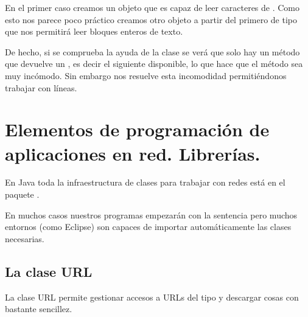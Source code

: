 \documentclass[letterpaper,10pt,spanish]{sphinxmanual}
\begin{document}
%
\begin{sphinxVerbatim}[commandchars=\\\{\}]
  
         
  
         
\end{sphinxVerbatim}

En el primer caso creamos un objeto  que es capaz de leer caracteres de . Como esto nos parece poco práctico creamos otro objeto a partir del primero de tipo  que nos permitirá leer bloques enteros de texto.

De hecho, si se comprueba la ayuda de la clase  se verá que solo hay un método  que devuelve un , es decir el siguiente  disponible, lo que hace que el método sea muy incómodo. Sin embargo  nos resuelve esta incomodidad permitiéndonos trabajar con líneas.


\section{Elementos de programación de aplicaciones en red. Librerías.}
\label{\detokenize{textos/tema3:elementos-de-programacion-de-aplicaciones-en-red-librerias}}
En Java toda la infraestructura de clases para trabajar con redes está en el paquete .

En muchos casos nuestros programas empezarán con la sentencia  pero muchos entornos (como Eclipse) son capaces de importar automáticamente las clases necesarias.


\subsection{La clase URL}
\label{\detokenize{textos/tema3:la-clase-url}}
La clase URL permite gestionar accesos a URLs del tipo  y descargar cosas con bastante sencillez.
\end{document}
